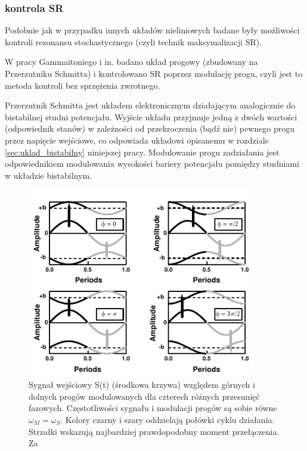   \subsubsection{kontrola SR}
  
  Podobnie jak w przypadku innych układów nieliniowych badane były możliwości kontroli rezonansu stochastycznego (czyli technik maksymalizacji SR). 

  W pracy Gammaitoniego i in. \cite{gammaitoni} badano układ progowy (zbudowany na Przerzutniku Schmitta) i kontrolowano SR poprzez modulację progu, czyli jest to metoda kontroli bez sprzężenia zwrotnego. 

  Przerzutnik Schmitta jest układem elektronicznym działającym analogicznie do bistabilnej studni potencjału. Wyjście układu przyjmuje jedną z dwóch wartości (odpowiednik stanów) w zależności od przekroczenia (bądź nie) pewnego progu przez napięcie wejściowe, co odpowiada układowi opisanemu w rozdziale \ref{sec:uklad_bistabilny} niniejszej pracy. Modulowanie progu zadziałania jest odpowiednikiem modulowania wysokości bariery potencjału pomiędzy studniami w układzie bistabilnym.

  \begin{figure}
    \includegraphics[width=100mm]{images/gammaitoni_1.png}
    \caption{Sygnał wejściowy S(t) (środkowa krzywa) względem górnych i dolnych progów modulowanych dla czterech różnych przesunięć fazowych. Częstotliwości sygnału i modulacji progów są sobie równe $\omega_M = \omega_S$. Kolory czarny i szary oddzielają połówki cyklu działania. Strzałki wskazują najbardziej prawdopodobny moment przełączenia. Za \cite{gammaitoni}}
    \label{fig:graphics:gammaitoni:fig1}
  \end{figure}

